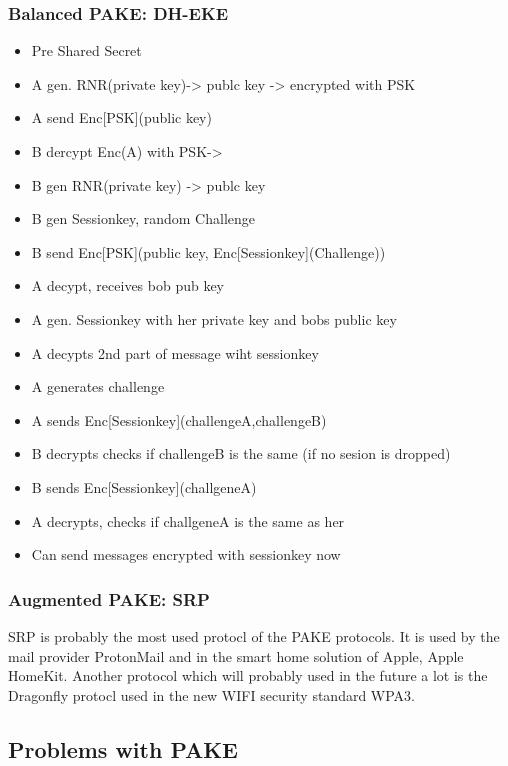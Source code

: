 \documentclass[journal]{IEEEtran}
\begin{document}
\subsubsection{Balanced PAKE: DH-EKE}
    \begin{itemize}[]
        \item  Pre Shared Secret
        \item  A gen. RNR(private key)-> publc key -> encrypted with PSK
        \item  A send Enc[PSK](public key)
        \item  B dercypt  Enc(A) with PSK->
        \item  B gen RNR(private key) -> publc key
        \item  B gen Sessionkey, random Challenge 
        \item  B send Enc[PSK](public key,  Enc[Sessionkey](Challenge))
        \item  A decypt, receives bob pub key
        \item  A gen. Sessionkey with her private key and bobs public key
        \item  A decypts 2nd part of message wiht sessionkey
        \item  A generates challenge
        \item  A sends Enc[Sessionkey](challengeA,challengeB)
        \item  B decrypts checks if challengeB is the same (if no sesion is dropped)
        \item  B sends Enc[Sessionkey](challgeneA)
        \item  A decrypts, checks if challgeneA is the same as her 
        \item  Can send messages encrypted with sessionkey now
    \end{itemize}
\subsubsection{Augmented PAKE: SRP}
    SRP is probably the most used protocl of the PAKE protocols.
    It is used by the mail provider ProtonMail and in the smart home solution of Apple, Apple HomeKit.
    Another protocol which will probably used in the future a lot is the Dragonfly protocl used in the new WIFI security standard WPA3. %

\subsection{Problems with PAKE}
\end{document}

